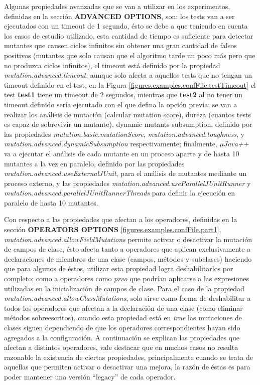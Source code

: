 Algunas propiedades avanzadas que se van a utilizar en los experimentos, definidas en la secci\'on \textbf{ADVANCED OPTIONS}, son: los tests van a ser ejecutados con un timeout de 1 segundo, \'esto se debe a que teniendo en cuenta los casos de estudio utilizado, esta cantidad de tiempo es suficiente para detectar mutantes que causen ciclos infinitos sin obtener una gran cantidad de falsos positivos (mutantes que solo causan que el algoritmo tarde un poco m\'as pero que no produzca ciclos infinitos), el timeout est\'a definido por la propiedad \emph{mutation.advanced.timeout}, aunque solo afecta a aquellos tests que no tengan un timeout definido en el test, en la Figura-\ref{figures.examples.confFile.testTimeout} el test \textbf{test1} tiene un timeout de 2 segundos, mientras que \textbf{test2} al no tener un timeout definido ser\'ia ejecutado con el que defina la opci\'on previa; se van a realizar los an\'alisis de mutaci\'on (calcular mutation score), dureza (cuantos tests es capaz de sobrevivir un mutante), dynamic mutants subsumption, definido por las propiedades \emph{mutation.basic.mutationScore}, \emph{mutation.advanced.toughness}, y \emph{mutation.advanced.dynamicSubsumption} respectivamente; finalmente, \emph{$\mu$Java++} va a ejecutar el an\'alisis de cada mutante en un proceso aparte y de hasta 10 mutantes a la vez en paralelo, definido por las propiedades \emph{mutation.advanced.useExternalJUnit}, para el an\'alisis de mutantes mediante un proceso externo, y las propiedades \emph{mutation.advanced.useParallelJUnitRunner} y \emph{mutation.advanced.parallelJUnitRunnerThreads} para definir la ejecuci\'on en paralelo de hasta 10 mutantes.

Con respecto a las propiedades que afectan a los operadores, definidas en la secci\'on \textbf{OPERATORS OPTIONS} \ref{figures.examples.confFile.part1}, \emph{mutation.advanced.allowFieldMutations} permite activar o desactivar la mutaci\'on de campos de clase, \'esto afecta tanto a operadores que aplican exclusivamente a declaraciones de miembros de una clase (campos, m\'etodos y subclases) haciendo que para algunos de \'estos, utilizar esta propiedad logra deshabilitarlos por completo; como a operadores como \emph{prvo} que podr\'ian aplicarse a las expresiones utilizadas en la inicializaci\'on de campos de clase. Para el caso de la propiedad \emph{mutation.advanced.allowClassMutations}, solo sirve como forma de deshabilitar a todos los operadores que afectan a la declaraci\'on de una clase (como eliminar m\'etodos sobreescritos), cuando esta propiedad est\'a en \emph{true} las mutaciones de clases siguen dependiendo de que los operadores correspondientes hayan sido agregados a la configuraci\'on. A continuaci\'on se explican las propiedades que afectan a distintos operadores, vale destacar que en muchos casos no resulta razonable la existencia de ciertas propiedades, principalmente cuando se trata de aquellas que permiten activar o desactivar una mejora, la raz\'on de \'estas es para poder mantener una versi\'on ``legacy'' de cada operador.

